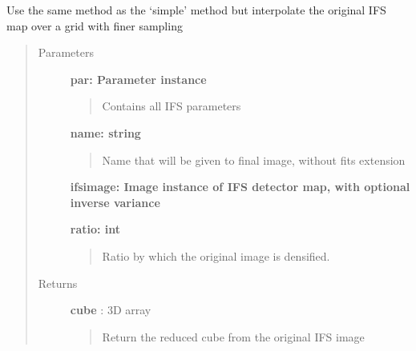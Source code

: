 \documentclass[letterpaper,10pt,english]{sphinxmanual}
\begin{document}
\begin{fulllineitems}
\label{tools:tools.reduction.densifiedSimpleReduction}
Use the same method as the `simple' method but interpolate the original IFS map over
a grid with finer sampling
\begin{quote}\begin{description}
\item[{Parameters}] \leavevmode
\textbf{par:    Parameter instance}
\begin{quote}

Contains all IFS parameters
\end{quote}

\textbf{name: string}
\begin{quote}

Name that will be given to final image, without fits extension
\end{quote}

\textbf{ifsimage: Image instance of IFS detector map, with optional inverse variance}

\textbf{ratio:  int}
\begin{quote}

Ratio by which the original image is densified.
\end{quote}

\item[{Returns}] \leavevmode
\textbf{cube} :  3D array
\begin{quote}

Return the reduced cube from the original IFS image
\end{quote}

\end{description}\end{quote}

\end{fulllineitems}

\end{document}
